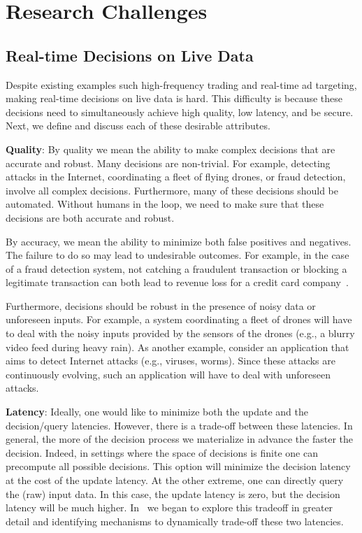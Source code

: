\section{Research Challenges }



\subsection{Real-time Decisions on Live Data} 

Despite existing examples such high-frequency trading and real-time ad targeting, making real-time decisions on live data is hard. This difficulty is because these decisions need to simultaneously achieve high quality, low latency, and be secure. Next, we define and discuss each of these desirable attributes.

{\bf Quality}: By quality we mean the ability to make complex decisions that are accurate and robust. Many decisions are non-trivial. For example, detecting attacks in the Internet, coordinating a fleet of flying drones, or fraud detection, involve all complex decisions. Furthermore, many of these decisions should be automated. Without humans in the loop, we need to make sure that these decisions are both accurate and robust. 

By accuracy, we mean the ability to minimize both false positives and negatives. The failure to do so may lead to undesirable outcomes. For example, in the case of a fraud detection system, not catching a fraudulent transaction or blocking a legitimate transaction can both lead to revenue loss for a credit card company~\cite{Sculley11}. 

Furthermore, decisions should be robust in the presence of noisy data or unforeseen inputs. For example, a system coordinating a fleet of drones will have to deal with the noisy inputs provided by the sensors of the drones (e.g., a blurry video feed during heavy rain). As another example, consider an application that aims to detect Internet attacks (e.g., viruses, worms). Since these attacks are continuously evolving, such an application will have to deal with unforeseen attacks.

{\bf Latency}:  Ideally, one would like to minimize both the update and the decision/query latencies. However, there is a trade-off between these latencies.  In general, the more of the decision process we materialize in advance the faster the decision. Indeed, in settings where the space of decisions is finite one can precompute all possible decisions. This option will minimize the decision latency at the cost of the update latency.  At the other extreme, one can directly query the (raw) input data. In this case, the update latency is zero, but the decision latency will be much higher.  In~\cite{Crankshaw15} we began to explore this tradeoff in greater detail and identifying mechanisms to dynamically trade-off these two latencies.

